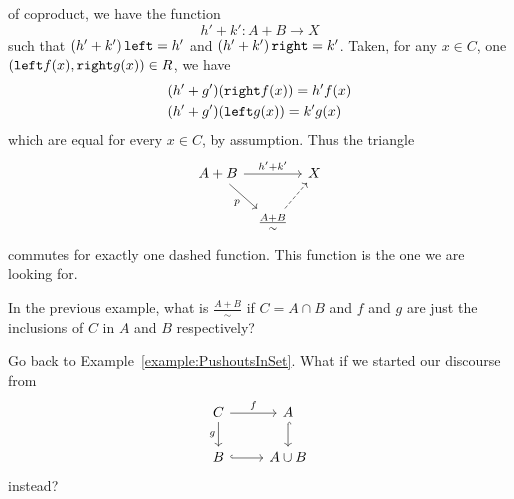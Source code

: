 \begin{example}
  of coproduct, we have the function
  \[h' + k' : A + B \to X\] such that
  \(\left(h' + k'\right) \mathtt{left} = h'\) and
  \(\left(h' + k'\right) \mathtt{right} = k'\). Taken, for any \(x \in C\), one
  \((\mathtt{left} f(x), \mathtt{right} g(x)) \in R\), we have
  \begin{align*}
    & (h'+g')(\mathtt{right} f(x)) = h'f(x) \\
    & (h'+g')(\mathtt{left} g(x)) = k'g(x) 
  \end{align*}
  which are equal for every \(x \in C\), by
  assumption.  Thus the triangle
  \[\begin{tikzcd}[column sep=tiny]
      A+B \ar["{h'+k'}", rr] \ar["p", dr, swap] & & X \\
      & \frac{A+B}{\sim} \ar[ur, dashed, swap]
    \end{tikzcd}\] commutes for exactly one dashed function. This
  function is the one we are looking
  for. 
\end{example}

\begin{exercise}
  In the previous example, what is \(\frac{A+B}{\sim}\) if
  \(C = A \cap B\) and \(f\) and \(g\) are just the inclusions of
  \(C\) in \(A\) and \(B\) respectively? 
\end{exercise}

\begin{exercise}
  Go back to Example~\ref{example:PushoutsInSet}. What if we started
  our discourse from
  \[\begin{tikzcd}
      C \ar["f", r] \ar["g", d, swap]  & A \ar[d, hookrightarrow] \\
      B \ar[r, hookrightarrow] & A \cup B
    \end{tikzcd}\] instead?
\end{exercise}

